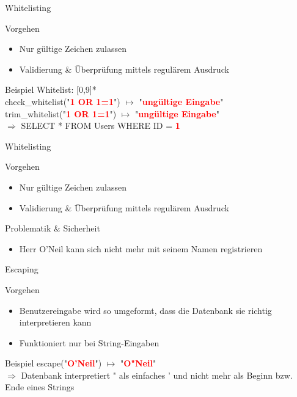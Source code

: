 \begin{frame}{Whitelisting}
\begin{block}{Vorgehen}
\begin{itemize}
	\item Nur gültige Zeichen zulassen
	\item Validierung \& Überprüfung mittels regulärem Ausdruck
\end{itemize}	
\end{block}
\begin{block}{Beispiel}	
	Whitelist: [0,9]* \\
	check\_whitelist("{}\textcolor{red}{\textbf{1 OR 1=1}}{}") $\mapsto$ "{}\textcolor{red}{\textbf{ungültige Eingabe}}{}" \\
	trim\_whitelist("{}\textcolor{red}{\textbf{1 OR 1=1}}{}") $\mapsto$ "{}\textcolor{red}{\textbf{ungültige Eingabe}}{}" \\
	$\Rightarrow$ SELECT * FROM Users WHERE ID = \textcolor{red}{\textbf{1}}
\end{block}
\end{frame}

\begin{frame}{Whitelisting}
\begin{block}{Vorgehen}
\begin{itemize}
	\item Nur gültige Zeichen zulassen
	\item Validierung \& Überprüfung mittels regulärem Ausdruck
\end{itemize}	
\end{block}
\begin{block}{Problematik \& Sicherheit}	
\begin{itemize}
\item Herr O'Neil kann sich nicht mehr mit seinem Namen registrieren
\end{itemize}
\end{block}
\end{frame}


\begin{frame}{Escaping}
\begin{block}{Vorgehen}
\begin{itemize}
\item Benutzereingabe wird so umgeformt, dass die Datenbank sie richtig interpretieren kann
\item Funktioniert nur bei String-Eingaben
\end{itemize}
\end{block}
\begin{block}{Beispiel}
	escape("{}\textcolor{red}{\textbf{O'Neil}}"{}) $\mapsto$ "{}\textcolor{red}{\textbf{O"{}Neil}}"{} \\
	$\Rightarrow$ Datenbank interpretiert "{} als einfaches ' und nicht mehr als Beginn bzw. Ende eines Strings
\end{block}
\end{frame}

